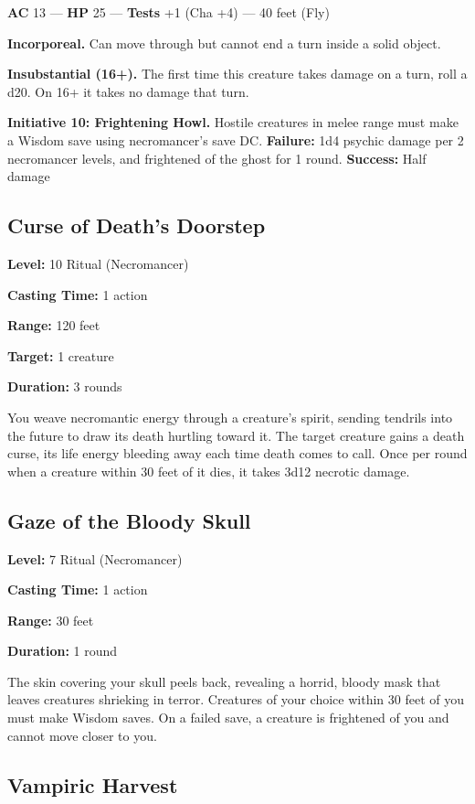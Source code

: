 \documentclass[12pt,letterpaper,twocolumn,openany,nodeprecatedcode,bg=none]{dndbook}
\let\oldsubsection\subsection
\renewcommand{\subsection}[1]{%
  \needspace{5\baselineskip}%
  \oldsubsection{#1}%
}
\begin{document}
\textbf{AC} 13 --- \textbf{HP} 25 --- \textbf{Tests} +1 (Cha +4) --- 40
feet (Fly)

\textbf{Incorporeal.} Can move through but cannot end a turn inside a
solid object.

\textbf{Insubstantial (16+).} The first time this creature takes damage
on a turn, roll a d20. On 16+ it takes no damage that turn.

\textbf{Initiative 10: Frightening Howl.} Hostile creatures in melee
range must make a Wisdom save using necromancer's save DC.
\textbf{Failure:} 1d4 psychic damage per 2 necromancer levels, and
frightened of the ghost for 1 round. \textbf{Success:} Half damage

\subsection{Curse of Death's Doorstep}\label{curse-of-deaths-doorstep}

\textbf{Level:} 10 Ritual (Necromancer)

\textbf{Casting Time:} 1 action

\textbf{Range:} 120 feet

\textbf{Target:} 1 creature

\textbf{Duration:} 3 rounds

You weave necromantic energy through a creature's spirit, sending
tendrils into the future to draw its death hurtling toward it. The
target creature gains a death curse, its life energy bleeding away each
time death comes to call. Once per round when a creature within 30 feet
of it dies, it takes 3d12 necrotic damage.

\subsection{Gaze of the Bloody Skull}\label{gaze-of-the-bloody-skull}

\textbf{Level:} 7 Ritual (Necromancer)

\textbf{Casting Time:} 1 action

\textbf{Range:} 30 feet

\textbf{Duration:} 1 round

The skin covering your skull peels back, revealing a horrid, bloody mask
that leaves creatures shrieking in terror. Creatures of your choice
within 30 feet of you must make Wisdom saves. On a failed save, a
creature is frightened of you and cannot move closer to you.

\subsection{Vampiric Harvest}\label{vampiric-harvest}
\end{document}
